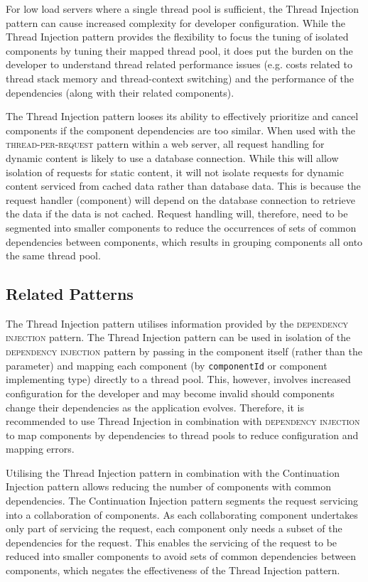 \documentclass[prodmode]{style/acmlarge}
\begin{document}
For low load servers where a single thread pool is sufficient, the Thread
Injection pattern can cause increased complexity for developer configuration.
While the Thread Injection pattern provides the flexibility to focus the tuning
of isolated components by tuning their mapped thread pool, it does put the
burden on the developer to understand thread related performance issues (e.g.
costs related to thread stack memory and thread-context switching) and the
performance of the dependencies (along with their related components).

The Thread Injection pattern looses its ability to effectively prioritize and
cancel components if the component dependencies are too similar.  When used with
the \textsc{thread-per-request} pattern within a web server, all request
handling for dynamic content is likely to use a database connection.  While this
will allow isolation of requests for static content, it will not isolate
requests for dynamic content serviced from cached data rather than database
data.  This is because the request handler (component) will depend on the
database connection to retrieve the data if the data is not cached.  Request
handling will, therefore, need to be segmented into smaller components to reduce
the occurrences of sets of common dependencies between components, which results
in grouping components all onto the same thread pool.


\subsection{Related Patterns}

The Thread Injection pattern utilises information provided by the
\textsc{dependency injection} pattern.  The Thread Injection pattern can be used
in isolation of the \textsc{dependency injection} pattern by passing in the
component itself (rather than the parameter) and mapping each component (by
\texttt{componentId} or component implementing type) directly to a thread pool.
This, however, involves increased configuration for the developer and may become
invalid should components change their dependencies as the application evolves. 
Therefore, it is recommended to use Thread Injection in combination with
\textsc{dependency injection} to map components by dependencies to thread pools
to reduce configuration and mapping errors.

Utilising the Thread Injection pattern in combination with the Continuation
Injection pattern allows reducing the number of components with common
dependencies.  The Continuation Injection pattern segments the request servicing
into a collaboration of components.  As each collaborating component undertakes
only part of servicing the request, each component only needs a subset of the
dependencies for the request.  This enables the servicing of the request to be
reduced into smaller components to avoid sets of common dependencies between
components, which negates the effectiveness of the Thread Injection pattern.
\end{document}
